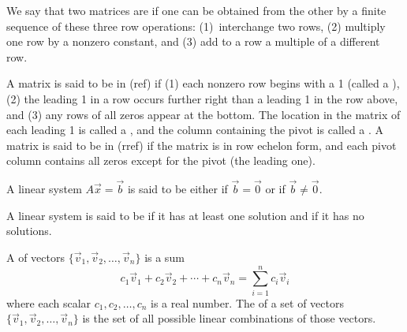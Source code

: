 \begin{definition} \label{def rref}
%
 We say that two matrices are  if one can be obtained from the other by a finite sequence of these three row operations: (1)~interchange two rows, (2) multiply one row by a nonzero constant, and (3) add to a row a multiple of a different row. 

A matrix is said to be in  (ref) if 
(1) each nonzero row begins with a 1 (called a ), 
(2) the leading 1 in a row occurs further right than a leading 1 in the row above, and
(3) any rows of all zeros appear at the bottom.
The location in the matrix of each leading 1 is called a , and the column containing the pivot is called a .
A matrix is said to be in  (rref) if 
the matrix is in row echelon form, and each pivot column contains all zeros except for the pivot (the leading one).

\end{definition}

\begin{definition}[Homogeneous]
A linear system $A\vec x=\vec b$ is said to be either  if $\vec b=\vec 0$ or  if $\vec b\neq \vec 0$.  
\end{definition}
\begin{definition}[Consistent]
A linear system is said to be  if it has at least one solution and   if it has no solutions.
\end{definition}



\begin{definition}
%
A  of vectors $\{\vec v_1,\vec v_2,\ldots,\vec v_n\}$ is a sum $$c_1 \vec v_1+c_2\vec v_2+\cdots+c_n\vec v_n = \sum_{i=1}^n c_i\vec v_i$$ where each scalar $c_1,c_2,\ldots, c_n$ is a real number. 
The  of a set of vectors $\{\vec v_1,\vec v_2,\ldots,\vec v_n\}$ is the set of all possible linear combinations of those vectors.
\end{definition}

